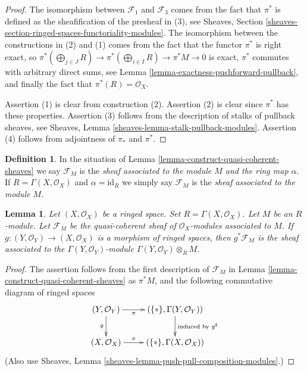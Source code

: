 \documentclass{stacks-project}
\theoremstyle{plain}
\newtheorem{lemma}[subsection]{Lemma}
\theoremstyle{definition}
\newtheorem{definition}[subsection]{Definition}
\theoremstyle{remark}
\numberwithin{equation}{subsection}
\begin{document}
\begin{proof}
The isomorphism between $\mathcal{F}_1$ and $\mathcal{F}_3$
comes from the fact that $\pi^*$ is defined as the sheafification
of the presheaf in (3), see Sheaves, Section
\ref{sheaves-section-ringed-spaces-functoriality-modules}.
The isomorphism between the constructions in (2) and (1) comes
from the fact that the functor $\pi^*$ is right exact, so
$\pi^*(\bigoplus_{j \in J} R) \to \pi^*(\bigoplus_{i \in I} R) \to
\pi^*M \to 0$ is exact, $\pi^*$ commutes with arbitrary
direct sums, see Lemma \ref{lemma-exactness-pushforward-pullback},
and finally the fact that $\pi^*(R) = \mathcal{O}_X$.

\medskip\noindent
Assertion (1) is clear from construction (2).
Assertion (2) is clear since $\pi^*$ has these properties.
Assertion (3) follows from the description of stalks of
pullback sheaves, see
Sheaves, Lemma \ref{sheaves-lemma-stalk-pullback-modules}.
Assertion (4) follows from adjointness of $\pi_*$ and
$\pi^*$.
\end{proof}

\begin{definition}
\label{definition-sheaf-associated}
In the situation of Lemma \ref{lemma-construct-quasi-coherent-sheaves}
we say $\mathcal{F}_M$ is the {\it sheaf associated to the module $M$
and the ring map $\alpha$}. If $R = \Gamma(X, \mathcal{O}_X)$
and $\alpha = \text{id}_R$ we simply say $\mathcal{F}_M$ is the
{\it sheaf associated to the module $M$}.
\end{definition}


\begin{lemma}
\label{lemma-restrict-quasi-coherent}
Let $(X, \mathcal{O}_X)$ be a ringed space.
Set $R = \Gamma(X, \mathcal{O}_X)$.
Let $M$ be an $R$-module.
Let $\mathcal{F}_M$ be the quasi-coherent sheaf of
$\mathcal{O}_X$-modules associated to $M$.
If $g : (Y, \mathcal{O}_Y) \to (X, \mathcal{O}_X)$
is a morphism of ringed spaces, then
$g^*\mathcal{F}_M$ is the sheaf associated
to the $\Gamma(Y, \mathcal{O}_Y)$-module
$\Gamma(Y, \mathcal{O}_Y) \otimes_R M$.
\end{lemma}

\begin{proof}
The assertion follows from the first description
of $\mathcal{F}_M$ in Lemma \ref{lemma-construct-quasi-coherent-sheaves}
as $\pi^*M$, and the following commutative diagram
of ringed spaces
$$
\xymatrix{
(Y, \mathcal{O}_Y) \ar[r]_-\pi \ar[d]_g &
(\{*\}, \Gamma(Y, \mathcal{O}_Y)) \ar[d]^{\text{induced by }g^\sharp} \\
(X, \mathcal{O}_X) \ar[r]^-\pi &
(\{*\}, \Gamma(X, \mathcal{O}_X))
}
$$
(Also use Sheaves, Lemma \ref{sheaves-lemma-push-pull-composition-modules}.)
\end{proof}
\end{document}

